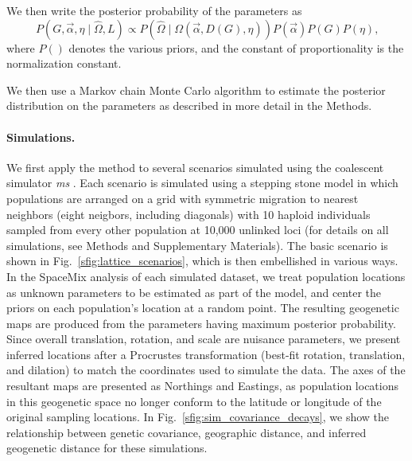 \documentclass[10pt,letterpaper]{article}
\begin{document}
We then write the posterior probability of the parameters as 
\begin{equation}
\label{eq:cyol_prob}
P \left( G, \vec{\alpha}, \eta \mid \widehat{\Omega}, L \right) \propto  
	P \left( \widehat{\Omega}  \mid \Omega(\vec{\alpha},{D}(G),\eta ) \right) P(\vec{\alpha}) P(G) P(\eta) \text{,}
\end{equation}
where $P( )$ denotes the various priors, and the constant of proportionality is the normalization constant.  

We then use a Markov chain Monte Carlo algorithm to estimate the posterior distribution on the parameters as described in more detail in the Methods.


\paragraph{Simulations.} 
We first apply the method to several scenarios simulated using the coalescent simulator \textit{ms} \cite{Hudson2002}.  
Each scenario is simulated using a stepping stone model in which populations are arranged on a grid with symmetric migration 
to nearest neighbors (eight neigbors, including diagonals)
with 10 haploid individuals sampled from every other population at 10,000 unlinked loci (for details on all simulations, see Methods and Supplementary Materials).  
The basic scenario is shown in Fig.\ \ref{sfig:lattice_scenarios}, 
which is then embellished in various ways.
In the SpaceMix analysis of each simulated dataset, 
we treat population locations as unknown parameters to be estimated as part of the model, 
and center the priors on each population's location at a random point.
The resulting geogenetic maps are produced from the parameters having maximum posterior probability.
Since overall translation, rotation, and scale are nuisance parameters,
we present inferred locations after a Procrustes transformation
(best-fit rotation, translation, and dilation) 	
to match the coordinates used to simulate the data.  
The axes of the resultant maps are presented as Northings and Eastings, 
as population locations in this geogenetic space no longer conform 
to the latitude or longitude of the original sampling locations.
In Fig.\ \ref{sfig:sim_covariance_decays}, we show the relationship between genetic covariance, 
geographic distance, and inferred geogenetic distance for these simulations.
%
\newline\newline
\end{document}
